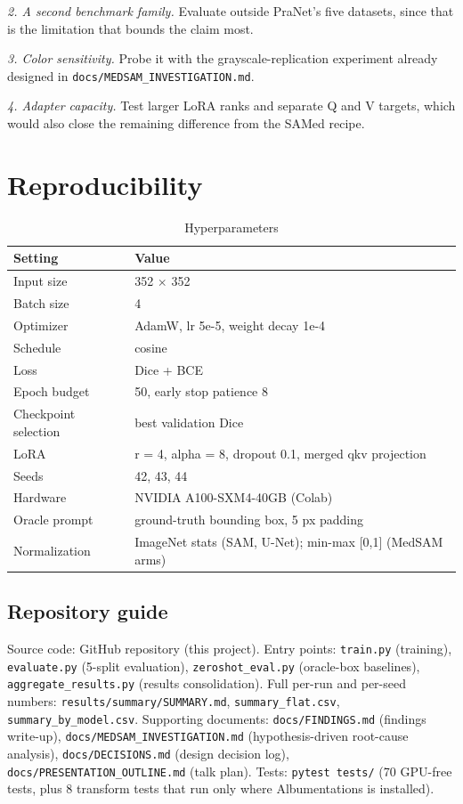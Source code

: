 \documentclass[conference]{IEEEtran}
\begin{document}
\textit{2. A second benchmark family.} Evaluate outside PraNet's five datasets, since that is the limitation that bounds the claim most.

\textit{3. Color sensitivity.} Probe it with the grayscale-replication experiment already designed in \texttt{docs/MEDSAM\_INVESTIGATION.md}.

\textit{4. Adapter capacity.} Test larger LoRA ranks and separate Q and V targets, which would also close the remaining difference from the SAMed recipe.


\section{Reproducibility}
\begin{table}[t]
\centering
\footnotesize
\caption{Hyperparameters}
\label{tab:8}
\begin{tabular}{lp{}}
\hline
\textbf{Setting} & \textbf{Value} \\
\hline
Input size & 352 $\times$ 352 \\
Batch size & 4 \\
Optimizer & AdamW, lr 5e-5, weight decay 1e-4 \\
Schedule & cosine \\
Loss & Dice + BCE \\
Epoch budget & 50, early stop patience 8 \\
Checkpoint selection & best validation Dice \\
LoRA & r = 4, alpha = 8, dropout 0.1, merged qkv projection \\
Seeds & 42, 43, 44 \\
Hardware & NVIDIA A100-SXM4-40GB (Colab) \\
Oracle prompt & ground-truth bounding box, 5 px padding \\
Normalization & ImageNet stats (SAM, U-Net); min-max [0,1] (MedSAM arms) \\
\hline
\end{tabular}
\end{table}


\subsection{Repository guide}
Source code: GitHub repository (this project). Entry points: \texttt{train.py} (training), \texttt{evaluate.py} (5-split evaluation), \texttt{zeroshot\_eval.py} (oracle-box baselines), \texttt{aggregate\_results.py} (results consolidation). Full per-run and per-seed numbers: \texttt{results/summary/SUMMARY.md}, \texttt{summary\_flat.csv}, \texttt{summary\_by\_model.csv}. Supporting documents: \texttt{docs/FINDINGS.md} (findings write-up), \texttt{docs/MEDSAM\_INVESTIGATION.md} (hypothesis-driven root-cause analysis), \texttt{docs/DECISIONS.md} (design decision log), \texttt{docs/PRESENTATION\_OUTLINE.md} (talk plan). Tests: \texttt{pytest~tests/} (70 GPU-free tests, plus 8 transform tests that run only where Albumentations is installed).
\end{document}
